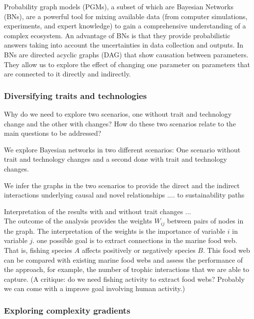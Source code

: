 \documentclass[12pt,a4paper]{article}
\begin{document}
Probability graph models (PGMs), a subset of which are Bayesian Networks (BNs), are a powerful tool for mixing available data (from computer simulations, experiments, and expert knowledge) to gain a comprehensive understanding of a complex ecosystem. An advantage of BNs is that they provide probabilistic answers taking into account the uncertainties in data collection and outputs. In BNs are directed acyclic graphs (DAG) that show causation between parameters. They allow us to explore the effect of changing one parameter on parameters that are connected to it directly and indirectly.



\subsubsection{Diversifying traits and technologies}
Why do we need to explore two scenarios, one without trait and technology change and the other with changes? How do these two scenarios relate to the main questions to be addressed? 

We explore Bayesian networks in two different scenarios: One scenario without trait and technology changes and a second done with trait and technology changes. 

We infer the graphs in the two scenarios to provide the direct and the indirect interactions underlying causal and novel relationships .... to sustainability paths

Interpretation of the results with and without trait changes ...\\
The outcome of the analysis provides the weights $W_{ij}$ between pairs of nodes in the graph. The interpretation of the weights is the importance of variable $i$ in variable $j$. one possible goal is to extract connections in the marine food web. That is, fishing species $A$ affects positively or negatively species $B$. This food web can be compared with existing marine food webs and assess the performance of the approach, for example, the number of trophic interactions that we are able to capture. (A critique: do we need fishing activity to extract food webs? Probably we can come with a improve goal involving human activity.) 



\subsubsection{Exploring complexity gradients}
\end{document}
